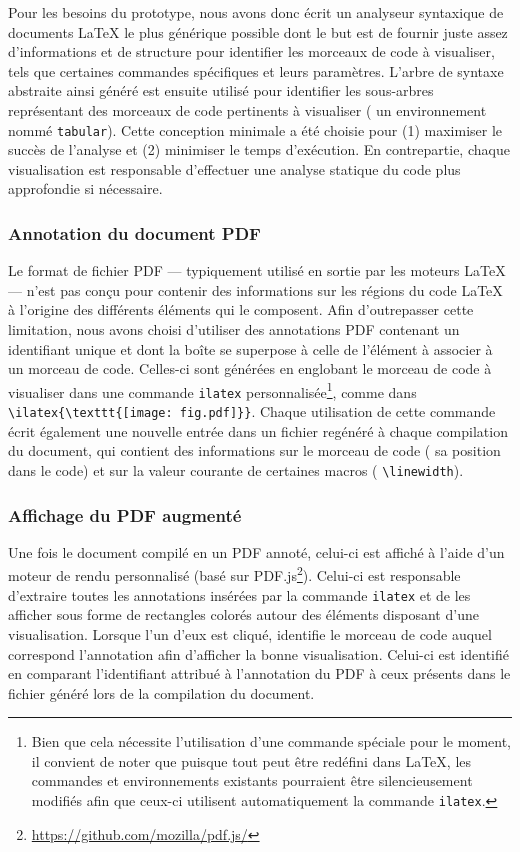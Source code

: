 Pour les besoins du prototype, nous avons donc écrit un analyseur syntaxique de documents \LaTeX{} le plus générique possible dont le but est de fournir juste assez d'informations et de structure pour identifier les morceaux de code à visualiser, tels que certaines commandes spécifiques et leurs paramètres.
L'arbre de syntaxe abstraite ainsi généré est ensuite utilisé pour identifier les sous-arbres représentant des morceaux de code pertinents à visualiser (\eg{} un environnement nommé \texttt{tabular}).
Cette conception minimale a été choisie pour (1) maximiser le succès de l'analyse et (2) minimiser le temps d'exécution.
En contrepartie, chaque visualisation est responsable d'effectuer une analyse statique du code plus approfondie si nécessaire.


\subsubsection{Annotation du document PDF}
Le format de fichier PDF --- typiquement utilisé en sortie par les moteurs \LaTeX{} --- n'est pas conçu pour contenir des informations sur les régions du code \LaTeX{} à l'origine des différents éléments qui le composent.
Afin d'outrepasser cette limitation, nous avons choisi d'utiliser des annotations PDF contenant un identifiant unique et dont la boîte se superpose à celle de l'élément à associer à un morceau de code.
Celles-ci sont générées en englobant le morceau de code à visualiser dans une commande \texttt{ilatex} personnalisée\footnote{Bien que cela nécessite l'utilisation d'une commande spéciale pour le moment, il convient de noter que puisque tout peut être redéfini dans \LaTeX{}, les commandes et environnements existants pourraient être silencieusement modifiés afin que ceux-ci utilisent automatiquement la commande \texttt{ilatex}.}, comme dans \verb|\ilatex{\texttt{[image: fig.pdf]}}|.
Chaque utilisation de cette commande écrit également une nouvelle entrée dans un fichier regénéré à chaque compilation du document, qui contient des informations sur le morceau de code (\eg{} sa position dans le code) et sur la valeur courante de certaines macros (\eg{} \verb|\linewidth|).


\subsubsection{Affichage du PDF augmenté}
Une fois le document compilé en un PDF annoté, celui-ci est affiché à l'aide d'un moteur de rendu personnalisé (basé sur PDF.js\footnote{\url{https://github.com/mozilla/pdf.js/}}).
Celui-ci est responsable d'extraire toutes les annotations insérées par la commande \texttt{ilatex} et de les afficher sous forme de rectangles colorés autour des éléments disposant d'une visualisation.
Lorsque l'un d'eux est cliqué, \iLaTeX{} identifie le morceau de code auquel correspond l'annotation afin d'afficher la bonne visualisation.
Celui-ci est identifié en comparant l'identifiant attribué à l'annotation du PDF à ceux présents dans le fichier généré lors de la compilation du document.


